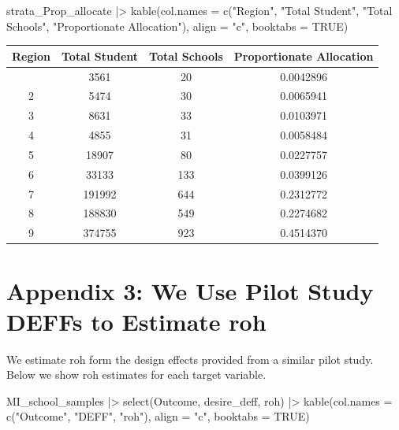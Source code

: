 \documentclass[
  12pt]{article}
\newenvironment{Shaded}{\begin{snugshade}}{\end{snugshade}}
\newcommand{\AttributeTok}[1]{\textcolor[rgb]{0.40,0.45,0.13}{#1}}
\newcommand{\ConstantTok}[1]{\textcolor[rgb]{0.56,0.35,0.01}{#1}}
\newcommand{\FunctionTok}[1]{\textcolor[rgb]{0.28,0.35,0.67}{#1}}
\newcommand{\NormalTok}[1]{\textcolor[rgb]{0.00,0.23,0.31}{#1}}
\newcommand{\SpecialCharTok}[1]{\textcolor[rgb]{0.37,0.37,0.37}{#1}}
\newcommand{\StringTok}[1]{\textcolor[rgb]{0.13,0.47,0.30}{#1}}
\begin{document}
\begin{Shaded}
\begin{Highlighting}[]
\NormalTok{strata\_Prop\_allocate }\SpecialCharTok{|\textgreater{}} 
   \FunctionTok{kable}\NormalTok{(}\AttributeTok{col.names =} \FunctionTok{c}\NormalTok{(}\StringTok{"Region"}\NormalTok{, }\StringTok{"Total Student"}\NormalTok{, }\StringTok{"Total Schools"}\NormalTok{, }
                      \StringTok{"Proportionate Allocation"}\NormalTok{),  }
        \AttributeTok{align =} \StringTok{"c"}\NormalTok{, }\AttributeTok{booktabs =} \ConstantTok{TRUE}\NormalTok{) }
\end{Highlighting}
\end{Shaded}

\begin{longtable}[]{@{}cccc@{}}
\toprule\noalign{}
Region & Total Student & Total Schools & Proportionate Allocation \\
\midrule\noalign{}
\endhead
\bottomrule\noalign{}
\endlastfoot
1 & 3561 & 20 & 0.0042896 \\
2 & 5474 & 30 & 0.0065941 \\
3 & 8631 & 33 & 0.0103971 \\
4 & 4855 & 31 & 0.0058484 \\
5 & 18907 & 80 & 0.0227757 \\
6 & 33133 & 133 & 0.0399126 \\
7 & 191992 & 644 & 0.2312772 \\
8 & 188830 & 549 & 0.2274682 \\
9 & 374755 & 923 & 0.4514370 \\
\end{longtable}

\newpage

\section{Appendix 3: We Use Pilot Study DEFFs to Estimate
roh}\label{appendix-3-we-use-pilot-study-deffs-to-estimate-roh}

We estimate roh form the design effects provided from a similar pilot
study. Below we show roh estimates for each target variable.

\begin{Shaded}
\begin{Highlighting}[]
\NormalTok{MI\_school\_samples }\SpecialCharTok{|\textgreater{}} 
  \FunctionTok{select}\NormalTok{(Outcome, desire\_deff, roh) }\SpecialCharTok{|\textgreater{}}  
    \FunctionTok{kable}\NormalTok{(}\AttributeTok{col.names =} \FunctionTok{c}\NormalTok{(}\StringTok{"Outcome"}\NormalTok{, }\StringTok{"DEFF"}\NormalTok{, }\StringTok{"roh"}\NormalTok{),  }
        \AttributeTok{align =} \StringTok{"c"}\NormalTok{, }\AttributeTok{booktabs =} \ConstantTok{TRUE}\NormalTok{) }
\end{Highlighting}
\end{Shaded}
\end{document}
